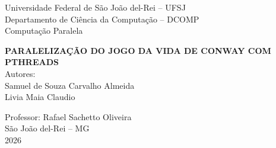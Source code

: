 \documentclass[12pt,a4paper]{article}
\begin{document}

\begin{titlepage}
    \centering

    {\large Universidade Federal de São João del-Rei -- UFSJ}\\
    {\large Departamento de Ciência da Computação -- DCOMP}\\
    {\large Computação Paralela}\\

    \vspace*{5cm}

    {\Large
        \textbf{\MakeUppercase{
            Paralelização do Jogo da Vida de Conway com Pthreads
        }}
    }\\[2cm]

    {\normalsize
        Autores:\\[0.3cm]
        Samuel de Souza Carvalho Almeida\\
        Livia Maia Claudio
    }

    \vfill

    {\normalsize Professor: Rafael Sachetto Oliveira}\\[1cm]
    {\large São João del-Rei -- MG}\\
    {\large 2026}
\end{titlepage}


\begin{abstract}
Este trabalho desenvolve e avalia uma versão paralela do Jogo da Vida de
Conway com Pthreads. A matriz é decomposta em faixas horizontais, a thread
principal participa do cálculo e uma barreira sincroniza as gerações. A
avaliação reúne duas campanhas em runners do GitHub Actions, com 59 entradas,
20 repetições e $P\in\{1,2,4,8\}$ participantes, totalizando 11\,680 execuções
válidas. A escalabilidade foi medida em relação à própria versão Pthreads com
$P=1$. No runner com dois núcleos físicos, $P=2$ alcançou speedup médio de 1,978
e eficiência de 98,9\% nas seis cargas de desempenho; $P=4$ elevou o speedup
para 2,043, mas reduziu a eficiência para 51,1\%. No runner com um núcleo
físico não houve ganho consistente. Entradas pequenas foram dominadas pelo
custo de criação e sincronização das threads, enquanto a execução acima da
capacidade lógica aumentou o custo sem ampliar o desempenho. Os resultados
mostram que a configuração adequada depende simultaneamente do tamanho da
carga e da topologia efetivamente disponibilizada ao processo.

\medskip
\noindent\textbf{Palavras-chave:} Pthreads; Jogo da Vida; autômatos celulares;
escalabilidade forte; speedup; oversubscription.
\end{abstract}
\end{document}
